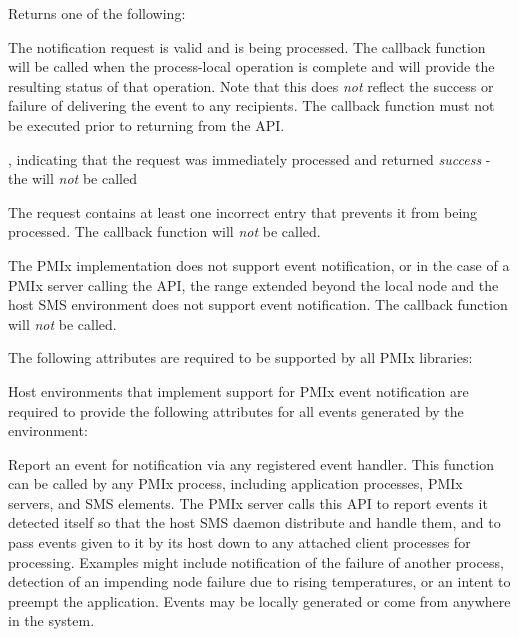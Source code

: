 Returns one of the following:
\begin{constantdesc}
\item {} The notification request is valid and is being processed. The callback function will be called when the process-local operation is complete and will provide the resulting status of that operation. Note that this does \textit{not} reflect the success or failure of delivering the event to any recipients. The callback function must not be executed prior to returning from the \ac{API}.
\item {}, indicating that the request was immediately processed and returned \textit{success} - the  will \textit{not} be called
\item {} The request contains at least one incorrect entry that prevents it from being processed. The callback function will \textit{not} be called.
\item {} The \ac{PMIx} implementation does not support event notification, or in the case of a \ac{PMIx} server calling the API, the range extended beyond the local node and the host \ac{SMS} environment does not support event notification. The callback function will \textit{not} be called.
\end{constantdesc}

\reqattrstart
The following attributes are required to be supported by all \ac{PMIx} libraries:


\divider

Host environments that implement support for \ac{PMIx} event notification are required to provide the following attributes for all events generated by the environment:


\reqattrend

\descr

Report an event for notification via any registered event handler. This function can be called by any \ac{PMIx} process, including application processes, \ac{PMIx} servers, and \ac{SMS} elements. The \ac{PMIx} server calls this \ac{API} to report events it detected itself so that the host \ac{SMS} daemon distribute and handle them, and to pass events given to it by its host down to any attached client processes for processing. Examples might include notification of the failure of another process, detection of an impending node failure due to rising temperatures, or an intent to preempt the application. Events may be locally generated or come from anywhere in the system.

